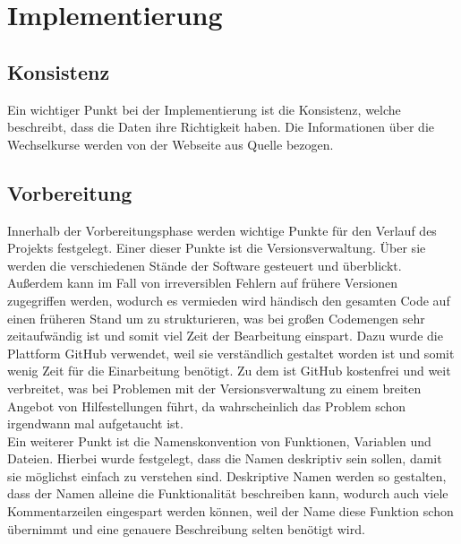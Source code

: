 \documentclass[conference]{IEEEtran}
\begin{document}
\section{Implementierung}

\subsection{Konsistenz}
Ein wichtiger Punkt bei der Implementierung ist die Konsistenz, welche beschreibt, dass die Daten ihre Richtigkeit haben. Die Informationen über die Wechselkurse werden von der Webseite aus Quelle \cite{waechselkurse} bezogen. 

\subsection{Vorbereitung}
Innerhalb der Vorbereitungsphase werden wichtige Punkte für den Verlauf des Projekts festgelegt. Einer dieser Punkte ist die Versionsverwaltung. Über sie werden die verschiedenen Stände der Software gesteuert und überblickt. Außerdem kann im Fall von irreversiblen Fehlern auf frühere Versionen zugegriffen werden, wodurch es vermieden wird händisch den gesamten Code auf einen früheren Stand um zu strukturieren, was bei großen Codemengen sehr zeitaufwändig ist und somit viel Zeit der Bearbeitung einspart. Dazu wurde die Plattform GitHub verwendet, weil sie verständlich gestaltet worden ist und somit wenig Zeit für die Einarbeitung benötigt. Zu dem ist GitHub kostenfrei und weit verbreitet, was bei Problemen mit der Versionsverwaltung zu einem breiten Angebot von Hilfestellungen führt, da wahrscheinlich das Problem schon irgendwann mal aufgetaucht ist.\\
Ein weiterer Punkt ist die Namenskonvention von Funktionen, Variablen und Dateien. Hierbei wurde festgelegt, dass die Namen deskriptiv sein sollen, damit sie möglichst einfach zu verstehen sind. Deskriptive Namen werden so gestalten, dass der Namen alleine die Funktionalität beschreiben kann, wodurch auch viele Kommentarzeilen eingespart werden können, weil der Name diese Funktion schon übernimmt und eine genauere Beschreibung selten benötigt wird.\\
\end{document}
